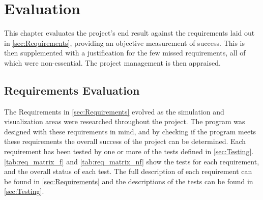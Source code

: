 
\chapter{Evaluation}\label{sec:Evaluation}

This chapter evaluates the project's end result against the requirements laid out in \cref{sec:Requirements}, providing an objective measurement of success.
This is then supplemented with a justification for the few missed requirements, all of which were non-essential.
The project management is then appraised.

\section{Requirements Evaluation}\label{sec:Evaluation:FailedReq}
The Requirements in \cref{sec:Requirements} evolved as the simulation and visualization areas were researched throughout the project.
The program was designed with these requirements in mind, and by checking if the program meets these requirements the overall success of the project can be determined.
Each requirement has been tested by one or more of the tests defined in \cref{sec:Testing}.
\cref{tab:req_matrix_f} and \cref{tab:req_matrix_nf} show the tests for each requirement, and the overall status of each test.
The full description of each requirement can be found in \cref{sec:Requirements} and the descriptions of the tests can be found in \cref{sec:Testing}.







